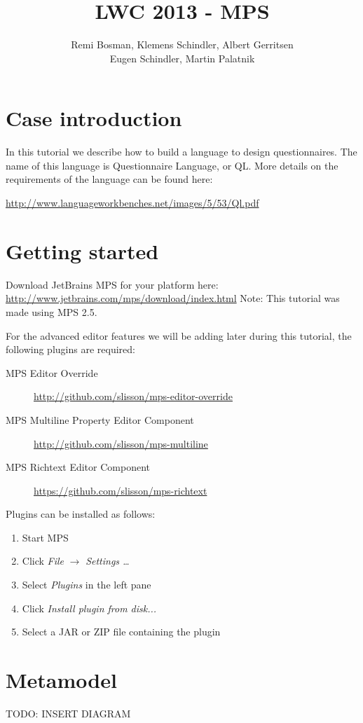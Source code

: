 \documentclass[11pt]{article}
\begin{document}
\title{LWC 2013 - MPS}
\author{Remi Bosman, Klemens Schindler, Albert Gerritsen\\
Eugen Schindler, Martin Palatnik}

\maketitle

\section{Case introduction}
In this tutorial we describe how to build a language to design questionnaires. The name of this language is Questionnaire Language, or QL.
More details on the requirements of the language can be found here:

\url{http://www.languageworkbenches.net/images/5/53/Ql.pdf}

\section{Getting started}
Download JetBrains MPS for your platform here:
\url{http://www.jetbrains.com/mps/download/index.html}
Note: This tutorial was made using MPS 2.5.

For the advanced editor features we will be adding later during this tutorial, the following plugins are required:
\begin{description}
\item[MPS Editor Override] \url{http://github.com/slisson/mps-editor-override}
\item[MPS Multiline Property Editor Component] \url{http://github.com/slisson/mps-multiline}
\item[MPS Richtext Editor Component] \url{https://github.com/slisson/mps-richtext}
\end{description}

Plugins can be installed as follows:
\begin{enumerate}
\item Start MPS
\item Click \textit{File} $\rightarrow$ \textit{Settings \ldots}
\item Select \textit{Plugins} in the left pane
\item Click \textit{Install plugin from disk...}
\item Select a JAR or ZIP file containing the plugin
\end{enumerate}

\section{Metamodel}
TODO: INSERT DIAGRAM
\end{document}
